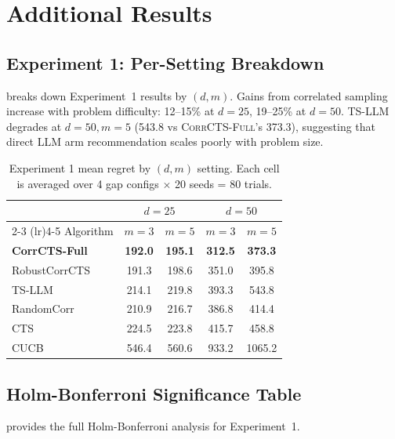 \documentclass{article}
\theoremstyle{plain}
\theoremstyle{definition}
\theoremstyle{remark}
\newcommand{\CorrFull}{\textsc{CorrCTS-Full}}
\begin{document}
\section{Additional Results}\label{app:additional}

\subsection{Experiment 1: Per-Setting Breakdown}

 breaks down Experiment~1 results by $(d, m)$.
Gains from correlated sampling increase with problem difficulty: 12--15\% at $d = 25$, 19--25\% at $d = 50$.
TS-LLM degrades at $d = 50, m = 5$ (543.8 vs \CorrFull{}'s 373.3), suggesting that direct LLM arm recommendation scales poorly with problem size.

\begin{table}[h]
\caption{Experiment 1 mean regret by $(d, m)$ setting. Each cell is averaged over 4 gap configs $\times$ 20 seeds = 80 trials.}
\label{tab:perdm}
\centering
\small
\begin{tabular}{@{}lcccc@{}}
\toprule
 & \multicolumn{2}{c}{$d=25$} & \multicolumn{2}{c}{$d=50$} \\
\cmidrule(lr){2-3} \cmidrule(lr){4-5}
Algorithm & $m{=}3$ & $m{=}5$ & $m{=}3$ & $m{=}5$ \\
\midrule
\textbf{CorrCTS-Full} & \textbf{192.0} & \textbf{195.1} & \textbf{312.5} & \textbf{373.3} \\
RobustCorrCTS & 191.3 & 198.6 & 351.0 & 395.8 \\
TS-LLM & 214.1 & 219.8 & 393.3 & 543.8 \\
RandomCorr & 210.9 & 216.7 & 386.8 & 414.4 \\
CTS & 224.5 & 223.8 & 415.7 & 458.8 \\
CUCB & 546.4 & 560.6 & 933.2 & 1065.2 \\
\bottomrule
\end{tabular}
\end{table}

\subsection{Holm-Bonferroni Significance Table}

 provides the full Holm-Bonferroni analysis for Experiment~1.
\end{document}
